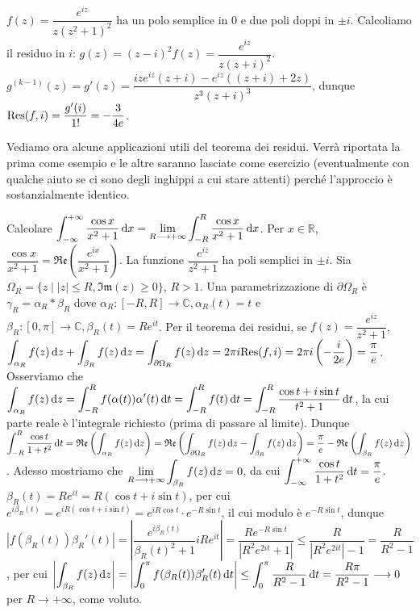 \begin{ex}
  $f(z)=\dfrac{e^{iz}}{z(z^2+1)^2}$ ha un polo semplice in $0$ e due poli doppi in $\pm i$. Calcoliamo il residuo in $i$: $g(z)=(z-i)^2f(z)=\dfrac{e^{iz}}{z(z+i)^2}$. $g^{(k-1)}(z)=g'(z)=\dfrac{ize^{iz}(z+i)-e^{iz}((z+i)+2z)}{z^3(z+i)^3}$, dunque $\text{Res}(f,i)=\dfrac{g'(i)}{1!}=-\dfrac{3}{4e}$.
\end{ex}

Vediamo ora alcune applicazioni utili del teorema dei residui. Verrà riportata la prima come esempio e le altre saranno lasciate come esercizio (eventualmente con qualche aiuto se ci sono degli inghippi a cui stare attenti) perché l'approccio è sostanzialmente identico.

\begin{ex}
  Calcolare $\displaystyle \int_{-\infty}^{+\infty} \frac{\cos{x}}{x^2+1}\mathop{}\!\mathrm{d} x=\lim_{R \longrightarrow +\infty} \int_{-R}^R \dfrac{\cos{x}}{x^2+1}\mathop{}\!\mathrm{d} x$. Per $x \in \mathbb{R}$, $\dfrac{\cos{x}}{x^2+1}=\mathfrak{Re}\left(\dfrac{e^{ix}}{x^2+1}\right)$.
  La funzione $\dfrac{e^{iz}}{z^2+1}$ ha poli semplici in $\pm i$. Sia $\Omega_R=\{z \mid |z| \le R, \mathfrak{Im}(z) \ge 0\}$, $R>1$. Una parametrizzazione di $\partial\Omega_R$ è $\gamma_R=\alpha_R*\beta_R$ dove $\alpha_R:[-R, R] \longrightarrow \mathbb{C}, \alpha_R(t)=t$ e $\beta_R:[0, \pi] \longrightarrow \mathbb{C}, \beta_R(t)=Re^{it}$.
  Per il teorema dei residui, se $f(z)=\dfrac{e^{iz}}{z^2+1}$, $\displaystyle \int_{\alpha_R} f(z)\mathop{}\!\mathrm{d} z+\int_{\beta_R}f(z)\mathop{}\!\mathrm{d} z=\int_{\partial \Omega_R} f(z)\mathop{}\!\mathrm{d} z=2\pi i\text{Res}(f, i)=2\pi i\left(-\frac{i}{2e}\right)=\frac{\pi}{e}$.
  Osserviamo che $\displaystyle \int_{\alpha_R} f(z)\mathop{}\!\mathrm{d} z=\int_{-R}^R f(\alpha(t))\alpha'(t)\mathop{}\!\mathrm{d} t=\int_{-R}^R f(t)\mathop{}\!\mathrm{d} t=\int_{-R}^R \frac{\cos{t}+i\sin{t}}{t^2+1}\mathop{}\!\mathrm{d} t$, la cui parte reale è l'integrale richiesto (prima di passare al limite).
  Dunque $\displaystyle \int_{-R}^R \dfrac{\cos{t}}{1+t^2}\mathop{}\!\mathrm{d} t=\mathfrak{Re}\left(\int_{\alpha_R} f(z)\mathop{}\!\mathrm{d} z\right)=\mathfrak{Re}\left(\int_{\partial \Omega_R} f(z)\mathop{}\!\mathrm{d} z-\int_{\beta_R}f(z)\mathop{}\!\mathrm{d} z\right)=\frac{\pi}{e}-\mathfrak{Re}\left(\int_{\beta_R} f(z) \mathop{}\!\mathrm{d} z\right)$.
  Adesso mostriamo che $\displaystyle \lim_{R \longrightarrow +\infty} \int_{\beta_R} f(z)\mathop{}\!\mathrm{d} z=0$, da cui $\displaystyle \int_{-\infty}^{+\infty} \frac{\cos{t}}{1+t^2}\mathop{}\!\mathrm{d} t=\frac{\pi}{e}$.
  $\beta_R(t)=Re^{it}=R(\cos{t}+i\sin{t})$, per cui $e^{i\beta_R(t)}=e^{iR(\cos{t}+i\sin{t})}=e^{iR\cos{t}}\cdot e^{-R\sin{t}}$, il cui modulo è $e^{-R\sin{t}}$, dunque $| f(\beta_R(t))\beta_R'(t)|=\left|\dfrac{e^{i\beta_R(t)}}{\beta_R(t)^2+1}iRe^{it}\right|=\dfrac{Re^{-R\sin{t}}}{|R^2e^{2it}+1|} \le \dfrac{R}{|R^2e^{2it}|-1}=\dfrac{R}{R^2-1}$, per cui
  $\displaystyle \left|\int_{\beta_R}f(z)\mathop{}\!\mathrm{d} z\right|=\left|\int_0^\pi f(\beta_R(t))\beta_R'(t)\mathop{}\!\mathrm{d} t\right| \le \int_0^\pi \frac{R}{R^2-1}\mathop{}\!\mathrm{d} t=\dfrac{R\pi}{R^2-1} \longrightarrow 0$ per $R \longrightarrow +\infty$, come voluto.
\end{ex}

